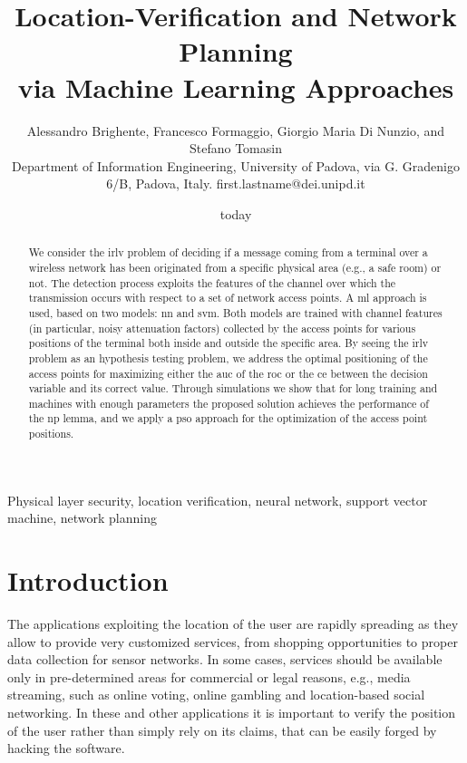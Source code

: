 \documentclass[twocolumns]{IEEEtran}
\title{Location-Verification and Network Planning \\ via Machine Learning Approaches}
\author{Alessandro Brighente, Francesco Formaggio, Giorgio Maria Di Nunzio, and  Stefano Tomasin  \\ {\small Department of Information Engineering, University of Padova, via G. Gradenigo 6/B, Padova, Italy. first.lastname@dei.unipd.it} }
\date{today}
\begin{document}
\maketitle

\begin{abstract}
We consider the \ac{irlv} problem of deciding if a message coming from a terminal over a wireless network has been originated from a specific physical area (e.g., a safe room) or not. The detection process exploits the features of the channel over which the transmission occurs with respect to a set of network access points. A  \ac{ml} approach is used, based on two models: \ac{nn} and \ac{svm}. Both models are trained with channel features (in particular, noisy attenuation factors) collected by the access points for various positions of the terminal both inside and outside the specific area. By seeing the \ac{irlv} problem as an hypothesis testing problem, we address the optimal positioning of the access points for maximizing either the \ac{auc} of the \ac{roc} or  the \ac{ce} between the decision variable and its correct value. Through simulations we show that for long training and machines with enough parameters the proposed solution achieves the performance of the \ac{np} lemma, and we apply a \ac{pso} approach for the optimization of the access point positions.
\end{abstract}

\begin{IEEEkeywords}
Physical layer security, location verification, neural network, support vector machine, network planning
\end{IEEEkeywords}
\glsresetall

\section{Introduction}

The applications exploiting the location of the user are rapidly spreading as they allow to provide very customized services, from shopping opportunities to proper data collection for sensor networks. In some cases, services should be available only in pre-determined areas for commercial or legal reasons, e.g., media streaming, such as online voting, online gambling and location-based social networking. In these and other applications it is important to verify the position of the user rather than simply rely on its claims, that can be easily forged by hacking the software.
\end{document}
